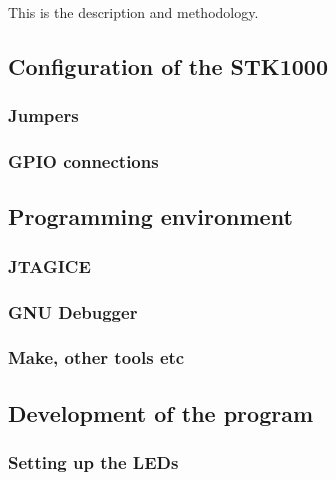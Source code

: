 This is the description and methodology.

\subsection{Configuration of the STK1000}

    \subsubsection{Jumpers}

        

    \subsubsection{GPIO connections}

        

\subsection{Programming environment}

    \subsubsection{JTAGICE}

        

    \subsubsection{GNU Debugger}

    \subsubsection{Make, other tools etc}

\subsection{Development of the program}

    \subsubsection{Setting up the LEDs}
        
        

